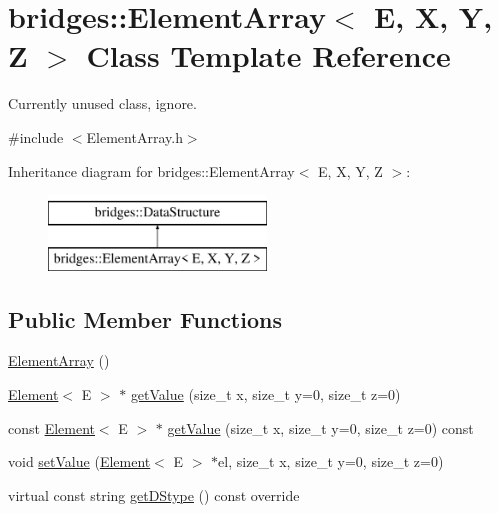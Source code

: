 \hypertarget{classbridges_1_1_element_array}{}\section{bridges\+:\+:Element\+Array$<$ E, X, Y, Z $>$ Class Template Reference}
\label{classbridges_1_1_element_array}


Currently unused class, ignore.  




{\ttfamily \#include $<$Element\+Array.\+h$>$}

Inheritance diagram for bridges\+:\+:Element\+Array$<$ E, X, Y, Z $>$\+:\begin{figure}[H]
\begin{center}
\leavevmode
\includegraphics[height=2.000000cm]{classbridges_1_1_element_array}
\end{center}
\end{figure}
\subsection*{Public Member Functions}
\begin{DoxyCompactItemize}
\item 
\mbox{\hyperlink{classbridges_1_1_element_array_aef0cfb2b7b35cd5b368e4c3987e41768}{Element\+Array}} ()
\item 
\mbox{\hyperlink{classbridges_1_1_element}{Element}}$<$ E $>$ $\ast$ \mbox{\hyperlink{classbridges_1_1_element_array_a45bac55f6f64a90eb61fd3faaf1aaffe}{get\+Value}} (size\+\_\+t x, size\+\_\+t y=0, size\+\_\+t z=0)
\item 
const \mbox{\hyperlink{classbridges_1_1_element}{Element}}$<$ E $>$ $\ast$ \mbox{\hyperlink{classbridges_1_1_element_array_a9e15557584b74ac7909cac00a2ab4fbe}{get\+Value}} (size\+\_\+t x, size\+\_\+t y=0, size\+\_\+t z=0) const
\item 
void \mbox{\hyperlink{classbridges_1_1_element_array_a202def849cd345d8b56ebcb31f332d25}{set\+Value}} (\mbox{\hyperlink{classbridges_1_1_element}{Element}}$<$ E $>$ $\ast$el, size\+\_\+t x, size\+\_\+t y=0, size\+\_\+t z=0)
\item 
virtual const string \mbox{\hyperlink{classbridges_1_1_element_array_adfb4e7d78ce01298ca66447e5c5abe6f}{get\+D\+Stype}} () const override
\end{DoxyCompactItemize}


